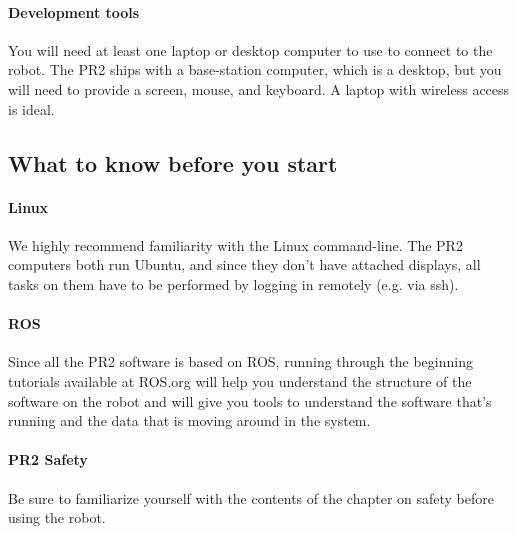 \paragraph{Development tools}
You will need at least one laptop or desktop computer to use to connect to the robot.  The PR2 ships with a base-station computer, which is a desktop, but you will need to provide a screen, mouse, and keyboard.  A laptop with wireless access is ideal.
\subsection{What to know before you start}
\paragraph{Linux} We highly recommend familiarity with the Linux command-line.  The PR2 computers both run Ubuntu, and since they don't have attached displays, all tasks on them have to be performed by logging in remotely (e.g. via ssh).
\paragraph{ROS} Since all the PR2 software is based on ROS, running through the beginning tutorials available at ROS.org will help you understand the structure of the software on the robot and will give you tools to understand the software that's running and the data that is moving around in the system.
\paragraph{PR2 Safety} Be sure to familiarize yourself with the contents of the chapter on safety before using the robot.
